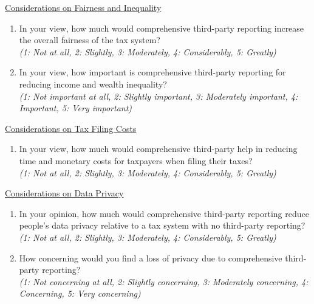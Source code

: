\documentclass[11pt]{article}
\begin{document}
\underline{Considerations on Fairness and Inequality}
\begin{enumerate}[resume]
    \item In your view, how much would comprehensive third-party reporting increase the overall fairness of the tax system?\\
    \textit{(1: Not at all, 2: Slightly, 3: Moderately, 4: Considerably, 5: Greatly)} 
    \item In your view, how important is comprehensive third-party reporting for reducing income and wealth inequality?\\
    \textit{(1: Not important at all, 2: Slightly important, 3: Moderately important, 4: Important, 5: Very important)}
\end{enumerate}
\underline{Considerations on Tax Filing Costs}
\begin{enumerate}[resume]    
    \item In your view, how much would comprehensive third-party help in reducing time and monetary costs for taxpayers when filing their taxes?\\
    \textit{(1: Not at all, 2: Slightly, 3: Moderately, 4: Considerably, 5: Greatly)} 
\end{enumerate}
\underline{Considerations on Data Privacy}
\begin{enumerate}[resume]    
    \item In your opinion, how much would comprehensive third-party reporting reduce people's data privacy relative to a tax system with no third-party reporting?\\
    \textit{(1: Not at all, 2: Slightly, 3: Moderately, 4: Considerably, 5: Greatly)}
    \item How concerning would you find a loss of privacy due to comprehensive third-party reporting?\\
    \textit{(1: Not concerning at all, 2: Slightly concerning, 3: Moderately concerning, 4: Concerning, 5: Very concerning)}
\end{enumerate}
\end{document}
